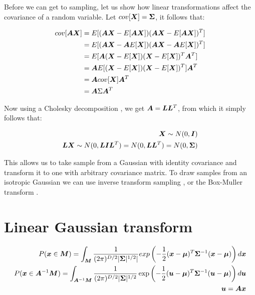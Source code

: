 Before we can get to sampling, let us show how linear transformations affect the covariance of a random variable. Let $cov[{\bm{X}}] = {\bm{\Sigma}}$, it follows that:

\begin{align}
cov[{\bm{A}} {\bm{X}}] &= E[({\bm{A}} {\bm{X}} - E[{\bm{A}} {\bm{X}}])({\bm{A}} {\bm{X}} - E[{\bm{A}} {\bm{X}}])^T] \\
&= E[({\bm{A}} {\bm{X}} - {\bm{A}} E[{\bm{X}}])({\bm{A}} {\bm{X}} - {\bm{A}} E[{\bm{X}}])^T] \\
&= E[{\bm{A}} ({\bm{X}} - E[{\bm{X}}])({\bm{X}} - E[{\bm{X}}])^T {\bm{A}}^T] \\
&= {\bm{A}} E[({\bm{X}} - E[{\bm{X}}])({\bm{X}} - E[{\bm{X}}])^T] {\bm{A}}^T \\
&= {\bm{A}} cov[{\bm{X}}] {\bm{A}}^T \\
&= {\bm{A}} \Sigma {\bm{A}}^T
\end{align}

Now using a Cholesky decomposition , we get ${\bm{A}} = {\bm{L}} {\bm{L}}^T$, from which it simply follows that:

\begin{align}
{\bm{X}} \sim N(0, {\bm{I}}) \\
{\bm{L}} {\bm{X}} \sim N(0, {\bm{L}} {\bm{I}} {\bm{L}}^T) = N(0, {\bm{L}} {\bm{L}}^T) = N(0, {\bm{\Sigma}})
\end{align}

This allows us to take sample from a Gaussian with identity covariance and transform it to one with arbitrary covariance matrix. To draw samples from an isotropic Gaussian we can use inverse transform sampling , or the Box-Muller transform .

\section{Linear Gaussian transform}

\begin{align}
P({\bm{x}} \in {\bm{M}}) = \int_{\bm{M}} \frac{1}{(2 \pi)^{D/2} |{\bm{\Sigma}}|^{1/2}|} exp \left(-\frac{1}{2} ({\bm{x}} - {\bm{\mu}})^T {\bm{\Sigma}}^{-1} ({\bm{x}} - {\bm{\mu}}) \right) d {\bm{x}} \\
P({\bm{x}} \in {\bm{A}}^{-1} {\bm{M}}) = \int_{{\bm{A}}^{-1} {\bm{M}}} \frac{1}{(2 \pi)^{D/2} |{\bm{\Sigma}}|^{1/2}} \exp \left(-\frac{1}{2} ({\bm{u}} - {\bm{\mu}})^T {\bm{\Sigma}}^{-1} ({\bm{u}} - {\bm{\mu}}) \right) d {\bm{u}} \\
{\bm{u}} = {\bm{A}} {\bm{x}}
\end{align}


        